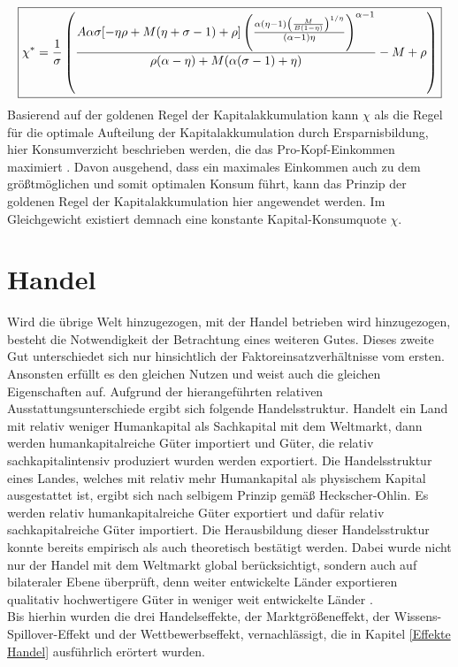 %
\begin{equation}
	\boxed{%
	\chi^*=\frac{1}{\sigma}\left(\frac{A\alpha \sigma[-\eta\rho+M(\eta+\sigma-1)+\rho] \left(\frac{\alpha  (\eta -1) \left(\frac{M}{B (1-\eta) }\right)^{1/\eta }}{(\alpha -1) \eta }\right)^{\alpha -1}}{\rho  (\alpha -\eta )+M (\alpha  (\sigma -1)+\eta )}-M+\rho\right)%
	}
\end{equation}
%
Basierend auf der goldenen Regel der Kapitalakkumulation kann $\chi$ als die Regel für die optimale Aufteilung der Kapitalakkumulation durch Ersparnisbildung, hier Konsumverzicht beschrieben werden, die das Pro-Kopf-Einkommen maximiert \cite{Nelson.1966}. Davon ausgehend, dass ein maximales Einkommen auch zu dem größtmöglichen und somit optimalen Konsum führt, kann das Prinzip der goldenen Regel der Kapitalakkumulation hier angewendet werden. Im Gleichgewicht existiert demnach eine konstante Kapital-Konsumquote $\chi$.
%
\section{Handel}
Wird die übrige Welt hinzugezogen, mit der Handel betrieben wird hinzugezogen, besteht die Notwendigkeit der Betrachtung eines weiteren Gutes. Dieses zweite Gut unterschiedet sich nur hinsichtlich der Faktoreinsatzverhältnisse vom ersten. Ansonsten erfüllt es den gleichen Nutzen und weist auch die gleichen Eigenschaften auf. 
Aufgrund der hierangeführten relativen Ausstattungsunterschiede ergibt sich folgende Handelsstruktur. Handelt ein Land mit relativ weniger Humankapital als Sachkapital mit dem Weltmarkt, dann werden humankapitalreiche Güter importiert und Güter, die relativ sachkapitalintensiv produziert wurden werden exportiert. Die Handelsstruktur eines Landes, welches mit relativ  mehr Humankapital als physischem Kapital ausgestattet ist, ergibt sich nach selbigem Prinzip gemäß Heckscher-Ohlin. Es werden relativ humankapitalreiche Güter exportiert und dafür relativ sachkapitalreiche Güter importiert. Die Herausbildung dieser Handelsstruktur konnte bereits empirisch als auch theoretisch bestätigt werden. Dabei wurde nicht nur der Handel mit dem Weltmarkt global berücksichtigt, sondern auch auf bilateraler Ebene überprüft, denn weiter entwickelte Länder exportieren qualitativ hochwertigere Güter in weniger weit entwickelte Länder \cite{Fajgelbaum.2011}.\\
%
Bis hierhin wurden die drei Handelseffekte, der Marktgrößeneffekt, der Wissens-Spillover-Effekt und der Wettbewerbseffekt, vernachlässigt, die in Kapitel \ref{Effekte Handel} ausführlich erörtert wurden.

